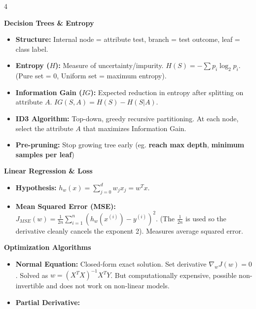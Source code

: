 \documentclass[8pt,landscape,a4paper]{extarticle}
\begin{document}
\begin{multicols*}{4}
{\vspace{1mm}
\noindent\textbf{Decision Trees \& Entropy}
\begin{itemize}[leftmargin=*, nosep]
    \item \textbf{Structure:} Internal node = attribute test, branch = test outcome, leaf = class label.
    \item \textbf{Entropy ($H$):} Measure of uncertainty/impurity. $H(S) = - \sum p_i \log_2 p_i$. (Pure set = 0, Uniform set = maximum entropy).
    \item \textbf{Information Gain ($IG$):} Expected reduction in entropy after splitting on attribute $A$. $IG(S, A) = H(S) - H(S|A)$. 
    \item \textbf{ID3 Algorithm:} Top-down, greedy recursive partitioning. At each node, select the attribute $A$ that maximizes Information Gain.
    \item \textbf{Pre-pruning:} Stop growing tree early (eg. \textbf{reach max depth}, \textbf{minimum samples per leaf})
\end{itemize}
}

\noindent\textbf{Linear Regression \& Loss}
\begin{itemize}[leftmargin=*, nosep]
    \item \textbf{Hypothesis:} $h_w(x) = \sum_{j=0}^d w_j x_j = w^T x$.
    \item \textbf{Mean Squared Error (MSE):} $J_{MSE}(w) = \frac{1}{2n} \sum_{i=1}^n (h_w(x^{(i)}) - y^{(i)})^2$. (The $\frac{1}{2n}$ is used so the derivative cleanly cancels the exponent 2). Measures average squared error.
\end{itemize}

\vspace{1mm}
\noindent\textbf{Optimization Algorithms}
\begin{itemize}[leftmargin=*, nosep]
    \item \textbf{Normal Equation:} Closed-form exact solution. Set derivative $\nabla_w J(w) = 0$. Solved as $w = (X^T X)^{-1} X^T Y$. But computationally expensive, possible non-invertible and does not work on non-linear models.
    \item \textbf{Partial Derivative:} 
    

\end{itemize}
\end{multicols*}
\end{document}
